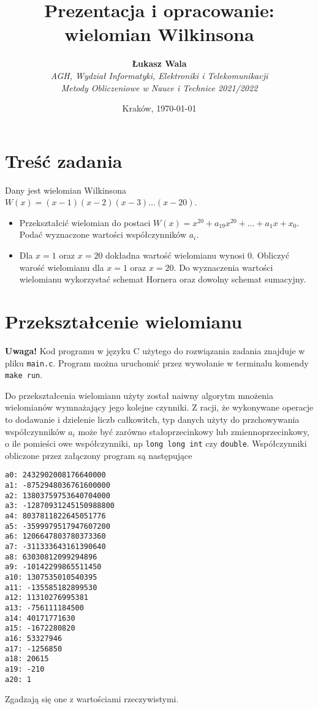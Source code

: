 \documentclass{article}
\title{Prezentacja i opracowanie: wielomian Wilkinsona}
\author{\textbf{Łukasz Wala}\\
    \textit{AGH, Wydział Informatyki, Elektroniki i Telekomunikacji} \\
    \textit{Metody Obliczeniowe w Nauce i Technice 2021/2022}}
\date{Kraków, \today}
\begin{document}
\maketitle

\section{Treść zadania}
Dany jest wielomian Wilkinsona $W(x)=(x-1)(x-2)(x-3)...(x-20)$.
\begin{itemize}
    \item
    Przekształcić wielomian do postaci $W(x)=x^{20}+a_{19}x^{20}+...+a_1x+x_0$. Podać wyznaczone wartości współczynników $a_i$.
    \item
    Dla $x=1$ oraz $x=20$ dokładna wartość wielomianu wynosi $0$. Obliczyć warość wielomianu dla $x=1$ oraz $x=20$. Do wyznaczenia wartości wielomianu wykorzystać schemat Hornera oraz dowolny schemat sumacyjny.
\end{itemize}

\section{Przekształcenie wielomianu}
\textbf{Uwaga!} Kod programu w języku C użytego do rozwiązania zadania znajduje w pliku \verb|main.c|.
Program można uruchomić przez wywołanie w terminalu komendy \verb|make run|.

Do przekształcenia wielomianu użyty został naiwny algorytm mnożenia wielomianów wymnażający jego kolejne czynniki.
Z racji, że wykonywane operacje to dodawanie i dzielenie liczb całkowitch, typ danych użyty do przchowywania współczynników $a_i$
może być zarówno stałoprzecinkowy lub zmiennoprzecinkowy, o ile pomieści owe współczynniki, np \verb|long long int| czy \verb|double|.
Współczynniki obliczone przez załączony program są następujące
\begin{verbatim}
a0: 2432902008176640000
a1: -8752948036761600000
a2: 13803759753640704000
a3: -12870931245150988800
a4: 8037811822645051776
a5: -3599979517947607200
a6: 1206647803780373360
a7: -311333643161390640
a8: 63030812099294896
a9: -10142299865511450
a10: 1307535010540395
a11: -135585182899530
a12: 11310276995381
a13: -756111184500
a14: 40171771630
a15: -1672280820
a16: 53327946
a17: -1256850
a18: 20615
a19: -210
a20: 1
\end{verbatim}
Zgadzają się one z wartościami rzeczywistymi.
\end{document}
